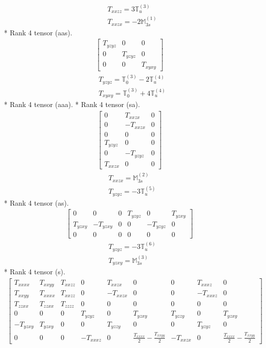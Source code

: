 \documentclass[fleqn,8pt,landscape]{jsarticle}
\begin{document}
\begin{align*}
& T_{xxzz} = 3 \mathbb{T}_{u}^{(3)} \\
& T_{xxzx} = - 2 \mathbb{M}_{3s}^{(1)}
\end{align*}
* Rank 4 tensor (aas).
\begin{align*}
\begin{bmatrix} T_{yzyz} & 0 & 0 \\ 0 & T_{yzyz} & 0 \\ 0 & 0 & T_{xyxy} \end{bmatrix}
\end{align*}
\begin{align*}
& T_{yzyz} = \mathbb{T}_{0}^{(3)} - 2 \mathbb{T}_{u}^{(4)} \\
& T_{xyxy} = \mathbb{T}_{0}^{(3)} + 4 \mathbb{T}_{u}^{(4)}
\end{align*}
* Rank 4 tensor (aaa).
* Rank 4 tensor (sa).
\begin{align*}
\begin{bmatrix} 0 & T_{xxzx} & 0 \\ 0 & - T_{xxzx} & 0 \\ 0 & 0 & 0 \\ T_{yzyz} & 0 & 0 \\ 0 & - T_{yzyz} & 0 \\ T_{xxzx} & 0 & 0 \end{bmatrix}
\end{align*}
\begin{align*}
& T_{xxzx} = \mathbb{M}_{3s}^{(2)} \\
& T_{yzyz} = - 3 \mathbb{T}_{u}^{(5)}
\end{align*}
* Rank 4 tensor (as).
\begin{align*}
\begin{bmatrix} 0 & 0 & 0 & T_{yzyz} & 0 & T_{yzxy} \\ T_{yzxy} & - T_{yzxy} & 0 & 0 & - T_{yzyz} & 0 \\ 0 & 0 & 0 & 0 & 0 & 0 \end{bmatrix}
\end{align*}
\begin{align*}
& T_{yzyz} = - 3 \mathbb{T}_{u}^{(6)} \\
& T_{yzxy} = \mathbb{M}_{3s}^{(3)}
\end{align*}
* Rank 4 tensor (s).
\begin{align*}
\begin{bmatrix} T_{xxxx} & T_{xxyy} & T_{xxzz} & 0 & T_{xxzx} & 0 & 0 & T_{xxxz} & 0 \\ T_{xxyy} & T_{xxxx} & T_{xxzz} & 0 & - T_{xxzx} & 0 & 0 & - T_{xxxz} & 0 \\ T_{zzxx} & T_{zzxx} & T_{zzzz} & 0 & 0 & 0 & 0 & 0 & 0 \\ 0 & 0 & 0 & T_{yzyz} & 0 & T_{yzxy} & T_{yzzy} & 0 & T_{yzxy} \\ - T_{yzxy} & T_{yzxy} & 0 & 0 & T_{yzzy} & 0 & 0 & T_{yzyz} & 0 \\ 0 & 0 & 0 & - T_{xxxz} & 0 & \frac{T_{xxxx}}{2} - \frac{T_{xxyy}}{2} & - T_{xxzx} & 0 & \frac{T_{xxxx}}{2} - \frac{T_{xxyy}}{2} \end{bmatrix}
\end{align*}
\end{document}
